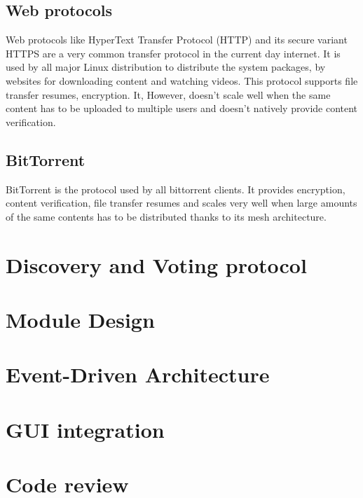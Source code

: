 \subsection{Web protocols}

Web protocols like HyperText Transfer Protocol (HTTP) and its secure variant HTTPS are a very common transfer protocol in the current day internet. It is used by all major Linux distribution to distribute the system packages, by websites for downloading content and watching videos. This protocol supports file transfer resumes, encryption. It, However, doesn't scale well when the same content has to be uploaded to multiple users and doesn't natively provide content verification.

\subsection{BitTorrent}

BitTorrent is the protocol used by all bittorrent clients. It provides encryption, content verification, file transfer resumes and scales very well when large amounts of the same contents has to be distributed thanks to its mesh architecture.

\section{Discovery and Voting protocol}

\section{Module Design}

\section{Event-Driven Architecture}

\section{GUI integration}

\section{Code review}
